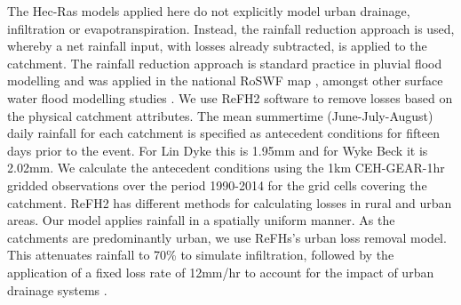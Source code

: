 \documentclass[APA,Times2COL]{WileyNJDv5}
\begin{document}
The Hec-Ras models applied here do not explicitly model urban drainage, infiltration or evapotranspiration. Instead, the rainfall reduction approach is used, whereby a net rainfall input, with losses already subtracted, is applied to the catchment. The rainfall reduction approach is standard practice in pluvial flood modelling and was applied in the national RoSWF map \citep{envagency2019}, amongst other surface water flood modelling studies \citep{chen2009pluvial,chang2015novel, henonin2013real, wang2018integrated}. We use ReFH2 software to remove losses based on the physical catchment attributes. The mean summertime (June-July-August) daily rainfall for each catchment is specified as antecedent conditions for fifteen days prior to the event. For Lin Dyke this is 1.95mm and for Wyke Beck it is 2.02mm. We calculate the antecedent conditions using the 1km CEH-GEAR-1hr gridded observations \citep{lewis2019gridded} over the period 1990-2014 for the grid cells covering the catchment. ReFH2 has different methods for calculating losses in rural and urban areas. Our model applies rainfall in a spatially uniform manner. As the catchments are predominantly urban, we use ReFHs's urban loss removal model. This attenuates rainfall to 70\% to simulate infiltration, followed by the application of a fixed loss rate of 12mm/hr to account for the impact of urban drainage systems \citep{envagency2019}. 
\end{document}
